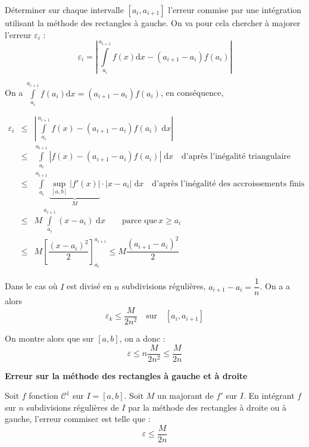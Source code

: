 \documentclass[10pt]{article}
\begin{document}
\begin{Objectif}
Déterminer sur chaque intervalle $[a_i,a_{i+1}]$ l'erreur commise par une intégration utilisant la méthode des rectangles à gauche. On va pour cela chercher à majorer l'erreur $\varepsilon_i$ :
$$
\varepsilon_i = \left| \int\limits_{a_i}^{a_{i+1}}f(x)\mathrm{d}x -\left(a_{i+1}-a_{i}\right) f(a_i)\right|
$$
\end{Objectif}

On a $\int\limits_{a_i}^{a_{i+1}}f(a_i)\mathrm{d}x=\left(a_{i+1}-a_{i}\right) f(a_i)$, en conséquence, 

\allowdisplaybreaks

\begin{eqnarray*}
\varepsilon_i &\leq &  \left| \int\limits_{a_i}^{a_{i+1}}f(x) - \left(a_{i+1}-a_{i}\right) f(a_i) \; \mathrm{d}x\right|  \\
&\leq &   \int\limits_{a_i}^{a_{i+1}} \left| f(x) - \left(a_{i+1}-a_{i}\right) f(a_i) \right|\; \mathrm{d}x \quad \text{d'après l'inégalité triangulaire}\\
&\leq &   \int\limits_{a_i}^{a_{i+1}} \underbrace{\underset{[a,b]}{\sup} \left| f'(x)\right|}_{M} \cdot \left| x-a_i\right|  \; \mathrm{d}x \quad \text{d'après l'inégalité des accroissements finis}\\
& \leq & M \int\limits_{a_i}^{a_{i+1}}  \left( x-a_i\right)  \; \mathrm{d}x \quad  \quad \text{parce que}\, x\geq a_i\\
& \leq & M   \left[ \dfrac{\left(x-a_i\right)^2}{2}\right]_{a_i}^{a_{i+1}} \leq M \dfrac{\left(a_{i+1}-a_i\right)^2}{2}
\end{eqnarray*}

Dans le cas où $I$ est divisé en $n$ subdivisions régulières, $a_{i+1}-a_i = \dfrac{1}{n}$. On a a alors 
$$
\varepsilon_k \leq \dfrac{M}{2n^2} \quad \text{sur}\quad [a_i,a_{i+1}]
$$

On montre alors que sur $[a,b]$, on a donc :
$$
\varepsilon \leq n\dfrac{M}{2n^2} \leq \dfrac{M}{2n} 
$$


\begin{resultat}
\textbf{Erreur sur la méthode des rectangles à gauche et à droite}

Soit $f$ fonction $\mathcal{C}^1$ sur $I=[a,b]$. Soit $M$ un majorant de $f'$ sur $I$. En intégrant $f$ sur $n$ subdivisions régulières de $I$ par la méthode des rectangles à droite ou à gauche, l'erreur commise$\varepsilon$ est telle que : 
$$ \varepsilon \leq \dfrac{M}{2n}$$ 

\end{resultat}
\end{document}
